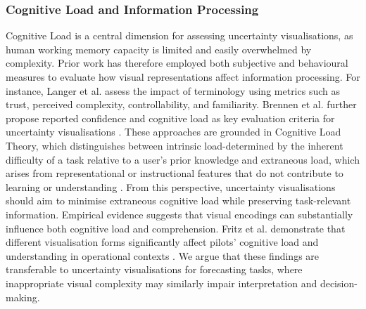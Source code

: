\documentclass[final,journal,a4paper]{IEEEtran}
\begin{document}
\subsubsection{Cognitive Load and Information Processing}
Cognitive Load is a central dimension for assessing uncertainty visualisations, as human working memory capacity is limited and easily overwhelmed by complexity. Prior work has therefore employed both subjective and behavioural measures to evaluate how visual representations affect information processing. For instance, Langer et al. \cite{Langer2022} assess the impact of terminology using metrics such as trust, perceived complexity, controllability, and familiarity. Brennen et al. \cite{Brennen2018} further propose reported confidence and cognitive load as key evaluation criteria for uncertainty visualisations \cite{Brennen2018}. These approaches are grounded in Cognitive Load Theory, which distinguishes between intrinsic load-determined by the inherent difficulty of a task relative to a user’s prior knowledge and extraneous load, which arises from representational or instructional features that do not contribute to learning or understanding \cite{Paas2010}. From this perspective, uncertainty visualisations should aim to minimise extraneous cognitive load while preserving task-relevant information. Empirical evidence suggests that visual encodings can substantially influence both cognitive load and comprehension. Fritz et al. \cite{Fritz2025} demonstrate that different visualisation forms significantly affect pilots’ cognitive load and understanding in operational contexts \cite{Fritz2025}. We argue that these findings are transferable to uncertainty visualisations for forecasting tasks, where inappropriate visual complexity may similarly impair interpretation and decision-making.
\end{document}
